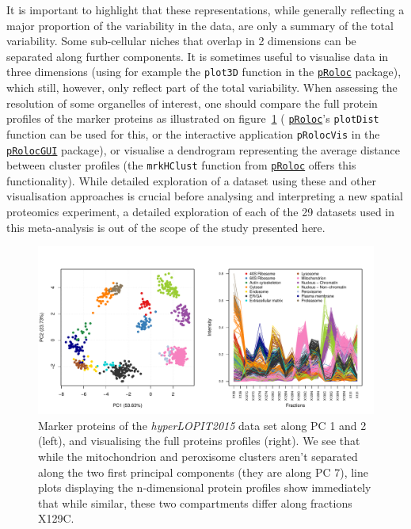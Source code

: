 \documentclass[12pt]{article}\usepackage[]{graphicx}\usepackage[]{color}
\makeatletter
\def\maxwidth{ %
  \ifdim\Gin@nat@width>\linewidth
    \linewidth
  \else
    \Gin@nat@width
  \fi
}
\newenvironment{knitrout}{}{} %
\newcommand{\Rpackage}[1]{\texttt{#1}}
\newcommand\Biocpkg[1]{%
  {\href{http://bioconductor.org/packages/#1}%
    {\Rpackage{#1}}}}
\makeatother
\begin{document}
\bigskip

It is important to highlight that these representations, while
generally reflecting a major proportion of the variability in the
data, are only a summary of the total variability. Some sub-cellular
niches that overlap in 2 dimensions can be separated along further
components. It is sometimes useful to visualise data in three
dimensions (using for example the \texttt{plot3D} function in the
\Biocpkg{pRoloc} package), which still, however, only reflect part of
the total variability. When assessing the resolution of some
organelles of interest, one should compare the full protein profiles
of the marker proteins as illustrated on figure~\ref{fig:plotDist}
(\Biocpkg{pRoloc}'s \texttt{plotDist} function can be used for this,
or the interactive application \texttt{pRolocVis} in the
\Biocpkg{pRolocGUI} package), or visualise a dendrogram representing
the average distance between cluster profiles (the \texttt{mrkHClust}
function from \Biocpkg{pRoloc} offers this functionality). While
detailed exploration of a dataset using these and other visualisation
approaches is crucial before analysing and interpreting a new spatial
proteomics experiment, a detailed exploration of each of the
29 datasets used in this meta-analysis is out of the
scope of the study presented here.

\begin{figure}
  \centering
\begin{knitrout}
\color{fgcolor}
\includegraphics[width=\maxwidth]{figure/plotDist-1} 

\end{knitrout}
  \caption{Marker proteins of the \textit{hyperLOPIT2015} data set
    along PC 1 and 2 (left), and visualising the full proteins
    profiles (right). We see that while the mitochondrion and
    peroxisome clusters aren't separated along the two first principal
    components (they are along PC 7), line plots displaying the
    n-dimensional protein profiles show immediately that while
    similar, these two compartments differ along fractions X129C.}
  \label{fig:plotDist}
\end{figure}
\end{document}
